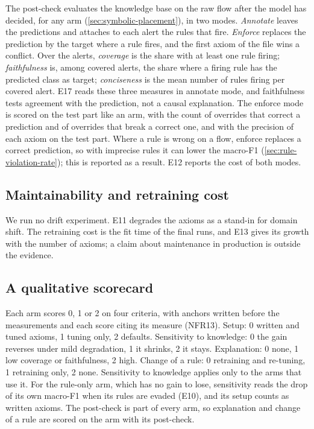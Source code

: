 The post-check evaluates the knowledge base on the raw flow after the model has decided,
for any arm (\cref{sec:symbolic-placement}), in two modes. \emph{Annotate} leaves the
predictions and attaches to each alert the rules that fire. \emph{Enforce} replaces the
prediction by the target where a rule fires, and the first axiom of the file wins a
conflict. Over the alerts, \emph{coverage} is the share with at least one
rule firing; \emph{faithfulness} is, among covered alerts, the share where a firing rule has
the predicted class as target; \emph{conciseness} is the mean number of rules firing per
covered alert. E17 reads these three measures in annotate mode, and faithfulness tests
agreement with the prediction, not a causal explanation. The enforce mode is scored on the test
part like an arm, with the count of overrides that correct a prediction and of overrides that
break a correct one, and with the precision of each axiom on the test part. Where a rule is wrong
on a flow, enforce replaces a correct prediction, so with imprecise rules it can lower the
macro-F1 (\cref{sec:rule-violation-rate}); this is reported as a result. E12 reports the cost of
both modes.

\subsection{Maintainability and retraining cost}
\label{sec:drift}

We run no drift experiment. E11 degrades the axioms as a stand-in for domain shift. The
retraining cost is the fit time of the final runs, and E13 gives its growth with the number of
axioms; a claim about maintenance in production is outside the evidence.

\subsection{A qualitative scorecard}
\label{sec:scorecard}

Each arm scores 0, 1 or 2 on four criteria, with anchors written before the measurements and
each score citing its measure (NFR13). Setup: 0 written and tuned axioms, 1 tuning only, 2
defaults. Sensitivity to knowledge: 0 the gain reverses under mild degradation, 1 it shrinks, 2
it stays. Explanation: 0 none, 1 low coverage or faithfulness, 2 high. Change of a rule: 0
retraining and re-tuning, 1 retraining only, 2 none. Sensitivity to knowledge applies only to the
arms that use it. For the rule-only arm, which has no gain to lose, sensitivity reads the drop of its
own macro-F1 when its rules are evaded (E10), and its setup counts as written axioms. The post-check is part of every arm, so explanation and change of a rule are
scored on the arm with its post-check.

